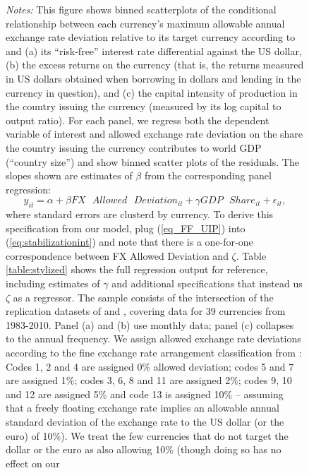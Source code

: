 \begin{figure}
\begin{minipage}{\linewidth}
    \bigskip \small \textit{Notes:} This figure shows binned
    scatterplots of the conditional relationship between each
    currency's maximum allowable annual exchange rate deviation relative to
    its target currency according to \cite{ilzetzki2018exchange} and
    (a) its ``risk-free'' interest rate differential against the US
    dollar, (b) the excess returns on the currency (that is, the
    returns measured in US dollars obtained when borrowing in dollars
    and lending in the currency in question), and (c) the capital
    intensity of production in the country issuing the currency (measured by its log
    capital to output ratio). For each panel, we regress both the
    dependent variable of interest and allowed exchange rate deviation
    on the share the country issuing the currency contributes to world
    GDP (``country size'') and show binned scatter plots of the
    residuals. The slopes shown are estimates of \(\beta\) from the
    corresponding panel regression:
    \begin{equation*}
      y_{it}
      = \alpha + \beta FX\text{ }Allowed\text{ }Deviation_{it}
      + \gamma GDP\text{ }Share_{it} + \epsilon_{it},
    \end{equation*}
    where standard errors are clusterd by currency. To derive this
    specification from our model, plug (\ref{eq_FF_UIP}) into
    (\ref{eq:stabilizationint}) and note that there is a one-for-one
    correspondence between FX Allowed Deviation and \(\zeta\). Table
    \ref{table:stylized} shows the full regression output for
    reference, including estimates of \(\gamma\) and additional
    specifications that instead us \(\zeta\) as a regressor. The
    sample consists of the intersection of the replication datasets of
    \cite{HassanMano2015} and \cite{ilzetzki2018exchange}, covering
    data for 39 currencies from 1983-2010. Panel (a) and (b) use
    monthly data; panel (c) collapses to the annual frequency. We
    assign allowed exchange rate deviations according to the fine
    exchange rate arrangement classification from
    \citet{ilzetzki2018exchange}: Codes 1, 2 and 4 are assigned 0\%
    allowed deviation; codes 5 and 7 are assigned 1\%; codes 3, 6, 8
    and 11 are assigned 2\%; codes 9, 10 and 12 are assigned 5\% and
    code 13 is assigned 10\% -- assuming that a freely floating
    exchange rate implies an allowable annual standard deviation of
    the exchange rate to the US dollar (or the euro) of 10\%). We
    treat the few currencies that do not target the dollar or the euro
    as also allowing 10\% (though doing so has no effect on our

\end{minipage}
\end{figure}

